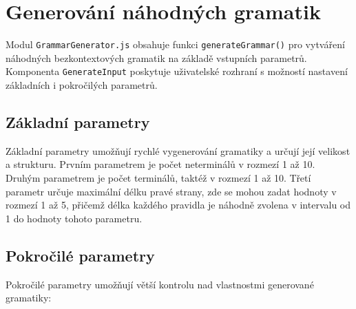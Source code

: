 \section{Generování náhodných gramatik}
\label{sec:GrammarsGeneration}

Modul \texttt{GrammarGenerator.js} obsahuje funkci \texttt{generateGrammar()} pro vytváření náhodných bezkontextových gramatik na základě vstupních parametrů. Komponenta \texttt{GenerateInput} poskytuje uživatelské rozhraní s možností nastavení základních i pokročilých parametrů.

\subsection{Základní parametry}
\label{sec:GrammarsGenerationBasic}

Základní parametry umožňují rychlé vygenerování gramatiky a určují její velikost a strukturu. Prvním parametrem je počet neterminálů v rozmezí 1 až 10. Druhým parametrem je počet terminálů, taktéž v rozmezí 1 až 10. Třetí parametr určuje maximální délku pravé strany, zde se mohou zadat hodnoty v rozmezí 1 až 5, přičemž délka každého pravidla je náhodně zvolena v intervalu od 1 do hodnoty tohoto parametru.

\subsection{Pokročilé parametry}
\label{sec:GrammarsGenerationAdvanced}

Pokročilé parametry umožňují větší kontrolu nad vlastnostmi generované gramatiky:

